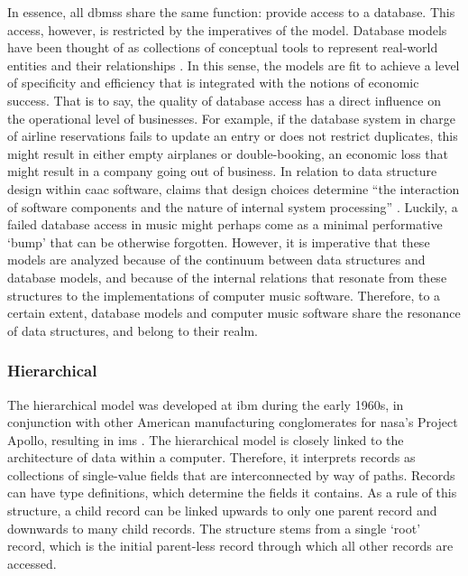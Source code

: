 In essence, all \gls{dbms}s share the same function: provide access to a database. This access, however, is restricted by the imperatives of the model. Database models have been thought of as collections of conceptual tools to represent real-world entities and their relationships \parencite[1]{2008:graph/anglesgutierrez/survey}. In this sense, the models are fit to achieve a level of specificity and efficiency that is integrated with the notions of economic success. That is to say, the quality of database access has a direct influence on the operational level of businesses. For example, if the database system in charge of airline reservations fails to update an entry or does not restrict duplicates, this might result in either empty airplanes or double-booking, an economic loss that might result in a company going out of business. In relation to data structure design within \gls{caac} software, \textcite{Ari05:Ano} claims that design choices determine ``the interaction of software components and the nature of internal system processing'' \parencite[18]{Ari05:Ano}. Luckily, a failed database access in music might perhaps come as a minimal performative `bump' that can be otherwise forgotten. However, it is imperative that these models are analyzed because of the continuum between data structures and database models, and because of the internal relations that resonate from these structures to the implementations of computer music software. Therefore, to a certain extent, database models and computer music software share the resonance of data structures, and belong to their realm.

% 
% 




\subsubsection{Hierarchical}
\label{model:hierarchical}


The hierarchical model was developed at \gls{ibm} during the early 1960s, in conjunction with other American manufacturing conglomerates for \gls{nasa}'s Project Apollo, resulting in \gls{ims} \parencite{2000-database-ims}. The hierarchical model is closely linked to the architecture of data within a computer. Therefore, it interprets records as collections of single-value fields that are interconnected by way of paths. Records can have type definitions, which determine the fields it contains. As a rule of this structure, a child record can be linked upwards to only one parent record and downwards to many child records. The structure stems from a single `root' record, which is the initial parent-less record through which all other records are accessed.

